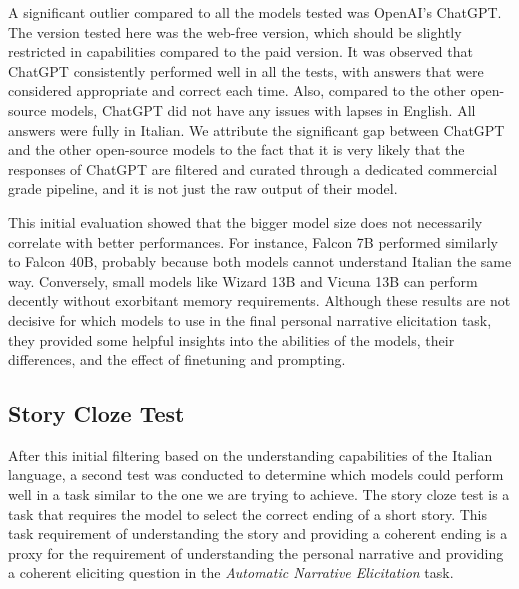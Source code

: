 A significant outlier compared to all the models tested was OpenAI's ChatGPT. The version tested here was the web-free version, which should be slightly restricted in capabilities compared to the paid version. It was observed that ChatGPT consistently performed well in all the tests, with answers that were considered appropriate and correct each time. Also, compared to the other open-source models, ChatGPT did not have any issues with lapses in English. All answers were fully in Italian. We attribute the significant gap between ChatGPT and the other open-source models to the fact that it is very likely that the responses of ChatGPT are filtered and curated through a dedicated commercial grade pipeline, and it is not just the raw output of their model.

This initial evaluation showed that the bigger model size does not necessarily correlate with better performances. For instance, Falcon 7B performed similarly to Falcon 40B, probably because both models cannot understand Italian the same way. Conversely, small models like Wizard 13B and Vicuna 13B can perform decently without exorbitant memory requirements. Although these results are not decisive for which models to use in the final personal narrative elicitation task, they provided some helpful insights into the abilities of the models, their differences, and the effect of finetuning and prompting.

\subsection{Story Cloze Test}
After this initial filtering based on the understanding capabilities of the Italian language, a second test was conducted to determine which models could perform well in a task similar to the one we are trying to achieve. The story cloze test is a task that requires the model to select the correct ending of a short story. This task requirement of understanding the story and providing a coherent ending is a proxy for the requirement of understanding the personal narrative and providing a coherent eliciting question in the  \emph{Automatic Narrative Elicitation} task.


